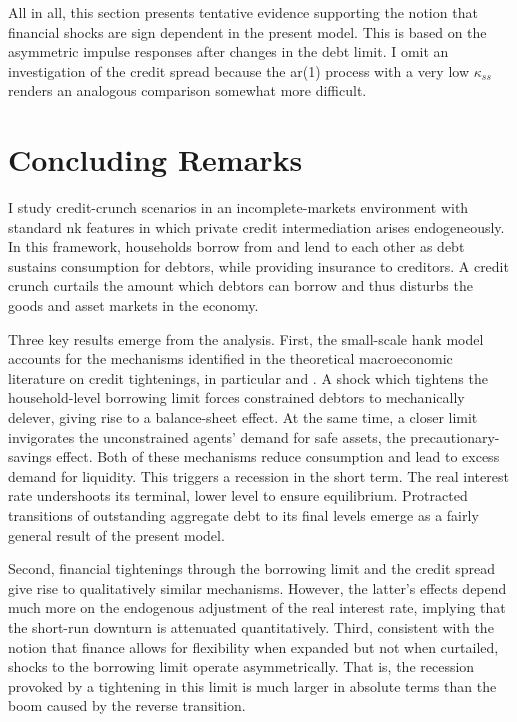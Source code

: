 \documentclass[a4paper,12pt]{article} %
\numberwithin{equation}{section} %
\numberwithin{figure}{section}
\numberwithin{table}{section}
\begin{document}
All in all, this section presents tentative evidence supporting the notion that financial shocks are sign dependent in the present model. This is based on the asymmetric impulse responses after changes in the debt limit. I omit an investigation of the credit spread because the \Gls{ar}(1) process with a very low $\kappa_{ss}$ renders an analogous comparison somewhat more difficult.

\section{Concluding Remarks}
\label{sec:conclusion}

I study credit-crunch scenarios in an incomplete-markets environment with standard \Gls{nk} features in which private credit intermediation arises endogeneously. In this framework, households borrow from and lend to each other as debt sustains consumption for debtors, while providing insurance to creditors. A credit crunch curtails the amount which debtors can borrow and thus disturbs the goods and asset markets in the economy. 

Three key results emerge from the analysis. First, the small-scale \Gls{hank} model accounts for the mechanisms identified in the theoretical macroeconomic literature on credit tightenings, in particular \textcite{egg2012} and \textcite{gl2017}. A shock which tightens the household-level borrowing limit forces constrained debtors to mechanically delever, giving rise to a balance-sheet effect. At the same time, a closer limit invigorates the unconstrained agents’ demand for safe assets, the precautionary-savings effect. Both of these mechanisms reduce consumption and lead to excess demand for liquidity. This triggers a recession in the short term. The real interest rate undershoots its terminal, lower level to ensure equilibrium. Protracted transitions of outstanding aggregate debt to its final levels emerge as a fairly general result of the present model.

Second, financial tightenings through the borrowing limit and the credit spread give rise to qualitatively similar mechanisms. However, the latter's effects depend much more on the endogenous adjustment of the real interest rate, implying that the short-run downturn is attenuated quantitatively. Third, consistent with the notion that finance allows for flexibility when expanded but not when curtailed, shocks to the borrowing limit operate asymmetrically. That is, the recession provoked by a tightening in this limit is much larger in absolute terms than the boom caused by the reverse transition.
\end{document}
